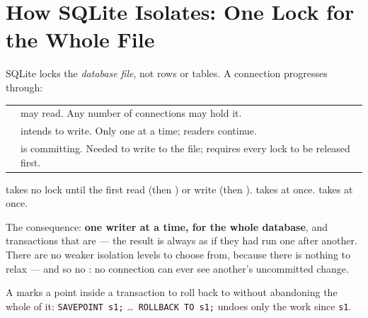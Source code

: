 \section{How SQLite Isolates: One Lock for the Whole File}

\begin{definitionbox}
SQLite locks the \emph{database file}, not rows or tables. A connection
progresses through:

\smallskip
\begin{tabular}{@{}L{2.8cm}L{11.0cm}@{}}
 & may read. Any number of connections may hold it. \\
 & intends to write. Only one at a time; readers continue. \\
 & is committing. Needed to write to the file; requires
  every  lock to be released first. \\
\end{tabular}

\smallskip
{} takes no lock until the first read (then
) or write (then ). 
takes  at once.  takes
 at once.

\smallskip
The consequence: \textbf{one writer at a time, for the whole database}, and
transactions that are  --- the result is always as if they
had run one after another. There are no weaker isolation levels to choose
from, because there is nothing to relax --- and so no :
no connection can ever see another's uncommitted change.

\smallskip
A  marks a point inside a transaction to roll back to
without abandoning the whole of it: \texttt{SAVEPOINT s1;} \dots\
\texttt{ROLLBACK TO s1;} undoes only the work since \texttt{s1}.
\end{definitionbox}

